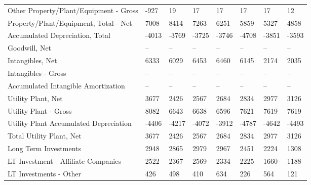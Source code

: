 \documentclass[grad,numbers]{coppe}
\begin{document}
\begin{longtable}[t]{llllllll}
  \hspace{1em}\hspace{1em}Other Property/Plant/Equipment - Gross & -927 & 19 & 17 & 17 & 17 & 17 & 12\\
  \hspace{1em}Property/Plant/Equipment, Total - Net & 7008 & 8414 & 7263 & 6251 & 5859 & 5327 & 4858\\
  \hspace{1em}\hspace{1em}Accumulated Depreciation, Total & -4013 & -3769 & -3725 & -3746 & -4708 & -3851 & -3593\\
  \hspace{1em}Goodwill, Net & -- & -- & -- & -- & -- & -- & --\\
  \hspace{1em}Intangibles, Net & 6333 & 6029 & 6453 & 6460 & 6145 & 2174 & 2035\\
  \hspace{1em}\hspace{1em}Intangibles - Gross & -- & -- & -- & -- & -- & -- & --\\
  \hspace{1em}\hspace{1em}Accumulated Intangible Amortization & -- & -- & -- & -- & -- & -- & --\\
  \hspace{1em}Utility Plant, Net & 3677 & 2426 & 2567 & 2684 & 2834 & 2977 & 3126\\
  \hspace{1em}\hspace{1em}Utility Plant - Gross & 8082 & 6643 & 6638 & 6596 & 7621 & 7619 & 7619\\
  \hspace{1em}\hspace{1em}Utility Plant Accumulated Depreciation & -4406 & -4217 & -4072 & -3912 & -4787 & -4642 & -4493\\
  \hspace{1em}Total Utility Plant, Net & 3677 & 2426 & 2567 & 2684 & 2834 & 2977 & 3126\\
  \hspace{1em}Long Term Investments & 2948 & 2865 & 2979 & 2967 & 2451 & 2224 & 1308\\
  \hspace{1em}\hspace{1em}LT Investment - Affiliate Companies & 2522 & 2367 & 2569 & 2334 & 2225 & 1660 & 1188\\
  \hspace{1em}\hspace{1em}LT Investments - Other & 426 & 498 & 410 & 634 & 226 & 564 & 121\\

\end{longtable}
\end{document}
